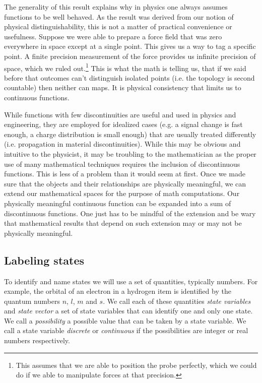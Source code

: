 \documentclass[aps,pra,10pt,twocolumn,floatfix,nofootinbib]{revtex4-1}
\theoremstyle{definition}
\begin{document}
The generality of this result explains why in physics one always assumes functions to be well behaved. As the result was derived from our notion of physical distinguishability, this is not a matter of practical convenience or usefulness. Suppose we were able to prepare a force field that was zero everywhere in space except at a single point. This gives us a way to tag a specific point. A finite precision measurement of the force provides us infinite precision of space, which we ruled out.\footnote{This assumes that we are able to position the probe perfectly, which we could do if we able to manipulate forces at that precision.} This is what the math is telling us, that if we said before that outcomes can't distinguish isolated points (i.e. the topology is second countable) then neither can maps. It is physical consistency that limits us to continuous functions.

While functions with few discontinuities are useful and used in physics and engineering, they are employed for idealized cases  (e.g. a signal change is fast enough, a charge distribution is small enough) that are usually treated differently (i.e. propagation in material discontinuities). While this may be obvious and intuitive to the physicist, it may be troubling to the mathematician as the proper use of many mathematical techniques requires the inclusion of discontinuous functions. This is less of a problem than it would seem at first. Once we made sure that the objects and their relationships are physically meaningful, we can extend our mathematical spaces for the purpose of math computations. Our physically meaningful continuous function can be expanded into a sum of discontinuous functions. One just has to be mindful of the extension and be wary that mathematical results that depend on such extension may or may not be physically meaningful.

\subsection{Labeling states}

To identify and name states we will use a set of quantities, typically numbers. For example, the orbital of an electron in a hydrogen item is identified by the quantum numbers $n$, $l$, $m$ and $s$. We call each of these quantities \emph{state variables} and \emph{state vector} a set of state variables that can identify one and only one state. We call a \emph{possibility} a possible value that can be taken by a state variable. We call a state variable \emph{discrete} or \emph{continuous} if the possibilities are integer or real numbers respectively.
\end{document}
